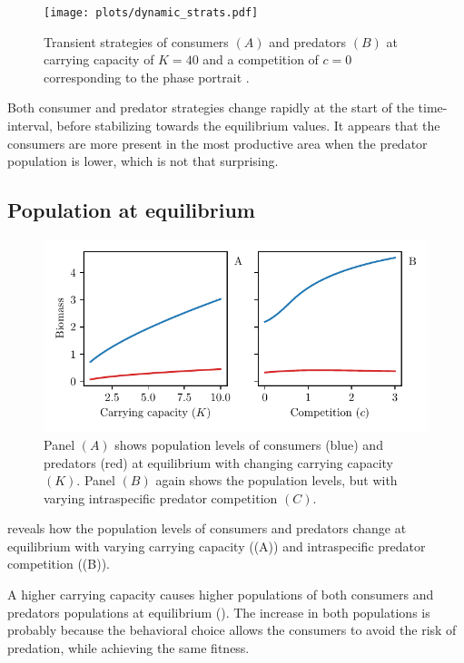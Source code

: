 \begin{figure}[H]
  \label{fig:pp}
  \caption{Transient strategies of consumers $(A)$ and predators $(B)$ at carrying capacity of $K=40$ and a competition of $c=0$ corresponding to the phase portrait .}
  \label{fig:dynamic_strategies}
  \texttt{[image: plots/dynamic\_strats.pdf]}
\end{figure}
Both consumer and predator strategies change rapidly at the start of the time-interval, before stabilizing towards the equilibrium values. It appears that the consumers are more present in the most productive area when the predator population is lower, which is not that surprising.

\subsection{Population at equilibrium}
\begin{figure}[H]
  \caption{Panel $(A)$ shows population levels of consumers (blue) and predators (red) at equilibrium with changing carrying capacity $(K)$. Panel $(B)$ again shows the population levels, but with varying intraspecific predator competition $(C)$.}
  \label{fig:pop_levels}
  \includegraphics{plots/pop_levels_c.pdf}
\end{figure}
 reveals how the population levels of consumers and predators change at equilibrium with varying carrying capacity ((A)) and intraspecific predator competition ((B)).


A higher carrying capacity causes higher populations of both consumers and predators populations at equilibrium (). The increase in both populations is probably because the behavioral choice allows the consumers to avoid the risk of predation, while achieving the same fitness.

